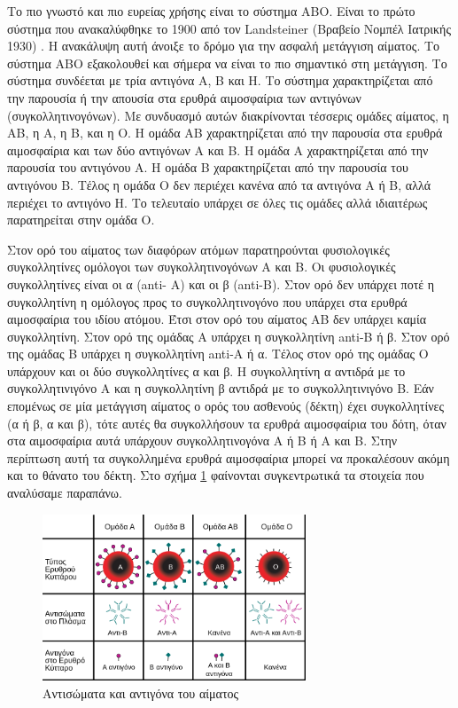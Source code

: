 			Το πιο γνωστό και πιο ευρείας χρήσης είναι το σύστημα ΑΒΟ. Είναι το πρώτο σύστημα που ανακαλύφθηκε το 1900 από τον Landsteiner (Βραβείο Νομπέλ Ιατρικής 1930) \cite{landsteinerABO}. Η ανακάλυψη αυτή άνοιξε το δρόμο για την ασφαλή μετάγγιση αίματος. Το σύστημα ΑΒΟ εξακολουθεί και σήμερα να είναι το πιο σημαντικό στη μετάγγιση. Το σύστημα συνδέεται με τρία αντιγόνα Α, Β και Η. Το σύστημα χαρακτηρίζεται από την παρουσία ή την απουσία στα ερυθρά αιμοσφαίρια των αντιγόνων (συγκολλητινογόνων). Με συνδυασμό αυτών διακρίνονται τέσσερις ομάδες αίματος, η ΑΒ, η Α, η Β, και η Ο. Η ομάδα ΑΒ χαρακτηρίζεται από την παρουσία στα ερυθρά αιμοσφαίρια και των δύο αντιγόνων Α και Β. Η ομάδα Α χαρακτηρίζεται από την παρουσία του αντιγόνου Α. Η ομάδα Β χαρακτηρίζεται από την παρουσία του αντιγόνου Β. Τέλος η ομάδα Ο δεν περιέχει κανένα από τα αντιγόνα Α ή Β, αλλά περιέχει το αντιγόνο Η. Το τελευταίο υπάρχει σε όλες τις ομάδες αλλά ιδιαιτέρως παρατηρείται στην ομάδα Ο.
			
			Στον ορό του αίματος των διαφόρων ατόμων παρατηρούνται φυσιολογικές συγκολλητίνες ομόλογοι των συγκολλητινογόνων Α και Β. Οι φυσιολογικές συγκολλητίνες είναι οι α (anti- A) και οι β (anti-B). Στον ορό δεν υπάρχει ποτέ η συγκολλητίνη η ομόλογος προς το συγκολλητινογόνο που υπάρχει στα ερυθρά αιμοσφαίρια του ιδίου ατόμου. Έτσι στον ορό του αίματος ΑΒ δεν υπάρχει καμία συγκολλητίνη. Στον ορό της ομάδας Α υπάρχει η συγκολλητίνη anti-B ή β. Στον ορό της ομάδας Β υπάρχει η συγκολλητίνη anti-Α ή α. Τέλος στον ορό της ομάδας Ο υπάρχουν και οι δύο συγκολλητίνες α και β. Η συγκολλητίνη α αντιδρά με το συγκολλητινιγόνο Α και η συγκολλητίνη β αντιδρά με το συγκολλητινιγόνο Β. Εάν επομένως σε μία μετάγγιση αίματος ο ορός του ασθενούς (δέκτη) έχει συγκολλητίνες (α ή β, α και β), τότε αυτές θα συγκολλήσουν τα ερυθρά αιμοσφαίρια του δότη, όταν στα αιμοσφαίρια αυτά υπάρχουν συγκολλητινογόνα Α ή Β ή Α και Β. Στην περίπτωση αυτή τα συγκολλημένα ερυθρά αιμοσφαίρια μπορεί να προκαλέσουν ακόμη και το θάνατο του δέκτη. Στο σχήμα \ref{fig:blood_antibodies_antigons} φαίνονται συγκεντρωτικά τα στοιχεία που αναλύσαμε παραπάνω.		
	\begin{figure}[h!]
	    \centering
	    \includegraphics[width=0.7\textwidth]{blood_antibodies_antigons.png}
	    \caption{Αντισώματα και αντιγόνα του αίματος}
	    \label{fig:blood_antibodies_antigons}
	\end{figure}
			

